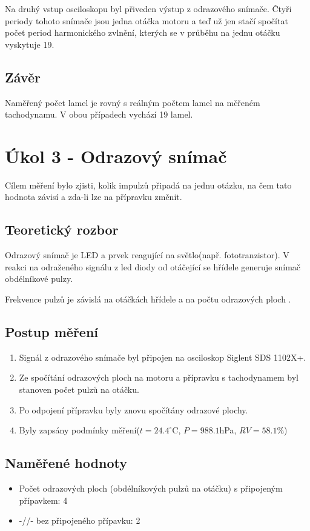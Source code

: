 \documentclass{protokol}
\begin{document}
        Na druhý vstup osciloskopu byl přiveden výstup z odrazového snímače. Čtyři periody tohoto snímače jsou jedna otáčka motoru a teď už jen stačí spočítat počet period harmonického zvlnění, kterých se v průběhu na jednu otáčku vyskytuje 19.

   
    \subsection{Závěr}
        Naměřený počet lamel je rovný s reálným počtem lamel na měřeném tachodynamu. V obou případech vychází 19 lamel.

\pagebreak

\section{Úkol 3 - Odrazový snímač}
    Cílem měření bylo zjisti, kolik impulzů připadá na jednu otázku, na čem tato hodnota závisí a zda-li lze na přípravku změnit.
    \subsection{Teoretický rozbor}
        Odrazový snímač je LED a prvek reagující na světlo(např. fototranzistor)\cite{navod}. V reakci na odraženého signálu z led diody od otáčející se hřídele generuje snímač obdélníkové pulzy.

        Frekvence pulzů je závislá na otáčkách hřídele a na počtu odrazových ploch \cite{navod}.

    \subsection{Postup měření}
        \begin{enumerate}
            \item Signál z odrazového snímače byl připojen na osciloskop Siglent SDS 1102X+.
            \item Ze spočítání odrazových ploch na motoru a přípravku s tachodynamem byl stanoven počet pulzů na otáčku.
            \item Po odpojení přípravku byly znovu spočítány odrazové plochy.
            \item Byly zapsány podmínky měření($t = 24.4 ^\circ$C, $P = 988.1$hPa, $RV = 58.1 \%$)
        \end{enumerate}
    \subsection{Naměřené hodnoty}
        \begin{itemize}
            \item Počet odrazových ploch (obdélníkových pulzů na otáčku) s připojeným přípavkem: 4
            \item -//- bez připojeného přípavku: 2
        \end{itemize}
\end{document}
